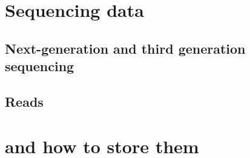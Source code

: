 \section{Sequencing data}
\subsection{Next-generation and third generation sequencing}
\subsection{Reads}

\section{\kmers and how to store them}

